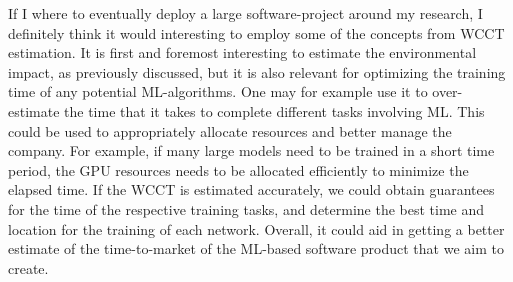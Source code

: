 \documentclass[a4paper,11pt]{article}
\begin{document}
If I where to eventually deploy a large software-project around my research, I definitely think it would interesting to employ some of the concepts from WCCT estimation. It is first and foremost interesting to estimate the environmental impact, as previously discussed, but it is also relevant for optimizing the training time of any potential ML-algorithms. One may for example use it to over-estimate the time that it takes to complete different tasks involving ML. This could be used to appropriately allocate resources and better manage the company. For example, if many large models need to be trained in a short time period, the GPU resources needs to be allocated efficiently to minimize the elapsed time. If the WCCT is estimated accurately, we could obtain guarantees for the time of the respective training tasks, and determine the best time and location for the training of each network. Overall, it could aid in getting a better estimate of the time-to-market of the ML-based software product that we aim to create.



\newpage
\printbibliography[heading=bibintoc,title={Bibliography}]
\end{document}
